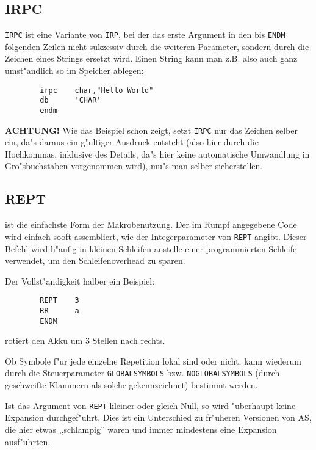 \documentclass[12pt,a4paper,twoside]{report}
\makeatletter
\newcommand{\bb}[1]{{\bf #1}}
\newcommand{\tty}[1]{{\tt #1}}
\newcommand{\ttindex}[1]{\index{#1@{\tt #1}}}
\makeatother
\begin{document}

\subsection{IRPC}
\ttindex{IRPC}

\tty{IRPC} ist eine Variante von \tty{IRP}, bei der das erste Argument in
den bis \tty{ENDM} folgenden Zeilen nicht sukzessiv durch die weiteren
Parameter, sondern durch die Zeichen eines Strings ersetzt wird.  Einen
String kann man z.B. also auch ganz umst"andlich so im Speicher ablegen:
\begin{verbatim}
        irpc    char,"Hello World"
        db      'CHAR'
        endm
\end{verbatim}
\bb{ACHTUNG!} Wie das Beispiel schon zeigt, setzt \tty{IRPC} nur das
Zeichen selber ein, da"s daraus ein g"ultiger Ausdruck entsteht (also hier
durch die Hochkommas, inklusive des Details, da"s hier keine automatische
Umwandlung in Gro"sbuchstaben vorgenommen wird), mu"s man selber
sicherstellen.


\subsection{REPT}
\ttindex{REPT}

ist die einfachste Form der Makrobenutzung.  Der im Rumpf angegebene
Code wird einfach sooft assembliert, wie der Integerparameter von
\tty{REPT} angibt.  Dieser Befehl wird h"aufig in kleinen Schleifen anstelle
einer programmierten Schleife verwendet, um den Schleifenoverhead zu
sparen.
\par
Der Vollst"andigkeit halber ein Beispiel:
\begin{verbatim}
        REPT    3
        RR      a
        ENDM
\end{verbatim}
rotiert den Akku um 3 Stellen nach rechts.
\par
Ob Symbole f"ur jede einzelne Repetition lokal sind oder nicht,
kann wiederum durch die Steuerparameter \tty{GLOBALSYMBOLS} bzw.
\tty{NOGLOBALSYMBOLS} (durch geschweifte Klammern als solche
gekennzeichnet) bestimmt werden.

Ist das Argument von \tty{REPT} kleiner oder gleich Null, so wird
"uberhaupt keine Expansion durchgef"uhrt.  Dies ist ein Unterschied
zu fr"uheren Versionen von AS, die hier etwas ,,schlampig'' waren
und immer mindestens eine Expansion ausf"uhrten.
\end{document}
